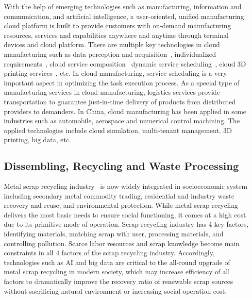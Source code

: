 \documentclass[letterpaper, twocolumn, 10pt, conference]{IEEEtran}
\begin{document}
With the help of emerging technologies such as manufacturing, information and communication, and artificial intelligence, a user-oriented, unified manufacturing cloud platform is built to provide customers with on-demand manufacturing resources, services and capabilities anywhere and anytime through terminal devices and cloud platform. There are multiple key technologies in cloud manufacturing such as data perception and acquisition~\cite{tao2014iot}, individualized requirements~\cite{zhou2018diverse}, cloud service composition~\cite{zhang2010flexible} dynamic service scheduling~\cite{zhou2018event}, cloud 3D printing services~\cite{zhou2018multi}, etc. In cloud manufacturing, service scheduling is a very important aspect in optimizing the task execution process. As a special type of manufacturing services in cloud manufacturing, logistics services provide transportation to guarantee just-in-time delivery of products from distributed providers to demanders. In China, cloud manufacturing has been applied in some industries such as automobile, aerospace and numerical control machining. The applied technologies include cloud simulation, multi-tenant management, 3D printing, big data, etc. 

\subsection{Dissembling, Recycling and Waste Processing}

Metal scrap recycling industry~\cite{uv2018-smartenvironment-tan.tian} is now widely integrated in socioeconomic system including secondary metal commodity trading, residential and industry waste recovery and reuse, and environmental protection. While metal scrap recycling delivers the most basic needs to ensure social functioning, it comes at a high cost due to its primitive mode of operation. 
Scrap recycling industry has 4 key factors, identifying materials, matching scrap with user, processing materials, and controlling pollution. 
Scarce labor resources and scrap knowledge become main constraints in all 4 factors of the scrap recycling industry. Accordingly, technologies such as AI and big data are critical to the all-round upgrade of metal scrap recycling in modern society, which may increase efficiency of all factors to dramatically improve the recovery ratio of renewable scrap sources without sacrificing natural environment or increasing social operation cost. 
\end{document}
